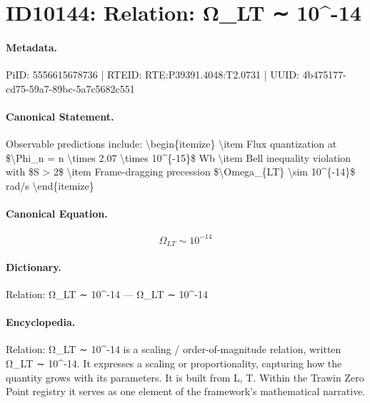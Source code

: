 \section*{ID10144: Relation: Ω\_LT ∼ 10\textasciicircum{}-14}
\paragraph{Metadata.}
PiID: 5556615678736 | RTEID: RTE:P39391.4048:T2.0731 | UUID: 4b475177-cd75-59a7-89bc-5a7c5682c551

\paragraph{Canonical Statement.}
Observable predictions include: \textbackslash{}begin\{itemize\} \textbackslash{}item Flux quantization at \$\textbackslash{}Phi\_n = n \textbackslash{}times 2.07 \textbackslash{}times 10\textasciicircum{}\{-15\}\$ Wb \textbackslash{}item Bell inequality violation with \$S > 2\$ \textbackslash{}item Frame-dragging precession \$\textbackslash{}Omega\_\{LT\} \textbackslash{}sim 10\textasciicircum{}\{-14\}\$ rad/s \textbackslash{}end\{itemize\}

\paragraph{Canonical Equation.}
\[
\Omega_{LT} \sim 10^{-14}
\]

\paragraph{Dictionary.}
Relation: Ω\_LT ∼ 10\textasciicircum{}-14 — Ω\_LT ∼ 10\textasciicircum{}-14

\paragraph{Encyclopedia.}
Relation: Ω\_LT ∼ 10\textasciicircum{}-14 is a scaling / order-of-magnitude relation, written Ω\_LT ∼ 10\textasciicircum{}-14. It expresses a scaling or proportionality, capturing how the quantity grows with its parameters. It is built from L, T. Within the Trawin Zero Point registry it serves as one element of the framework's mathematical narrative.
